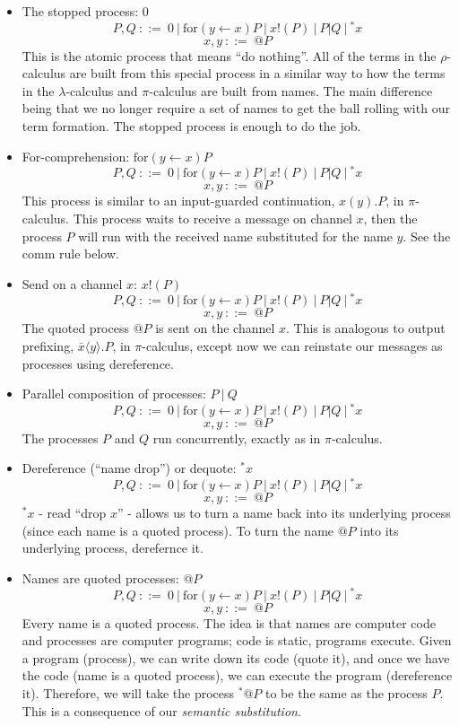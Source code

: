\documentclass[12pt]{article}
\numberwithin{equation}{section}
\begin{document}
\begin{itemize}
\item The stopped process: 0
\[ P, Q \ ::= \ 0 \ | \ \text{for}( y \leftarrow x)P \ | \ x!(P) \ | \ P | Q \ | \ {}^* x \]
\[ x, y \ ::= \ @P \]
This is the atomic process that means ``do nothing''. All of the terms in the $\rho$-calculus are built from this special process in a similar way to how the terms in the $\lambda$-calculus and $\pi$-calculus are built from names. The main difference being that we no longer require a set of names to get the ball rolling with our term formation. The stopped process is enough to do the job.

\item For-comprehension: $\text{for}( y \leftarrow x)P$
\[ P, Q \ ::= \ 0 \ | \ \text{for}( y \leftarrow x)P \ | \ x!(P) \ | \ P | Q \ | \ {}^* x \]
\[ x, y \ ::= \ @P \]
This process is similar to an input-guarded continuation, $x(y).P$, in $\pi$-calculus. This process waits to receive a message on channel $x$, then the process $P$ will run with the received name substituted for the name $y$. See the comm rule below. \\

\item Send on a channel $x$: $x!(P)$
\[ P, Q \ ::= \ 0 \ | \ \text{for}( y \leftarrow x)P \ | \ x!(P) \ | \ P | Q \ | \ {}^* x \]
\[ x, y \ ::= \ @P \]
The quoted process $@P$ is sent on the channel $x$. This is analogous to output prefixing, $\bar{x} \langle y \rangle.P$, in $\pi$-calculus, except now we can reinstate our messages as processes using dereference. \\

\item Parallel composition of processes: $P \ | \ Q$
\[ P, Q \ ::= \ 0 \ | \ \text{for}( y \leftarrow x)P \ | \ x!(P) \ | \ P | Q \ | \ {}^* x \]
\[ x, y \ ::= \ @P \]
The processes $P$ and $Q$ run concurrently, exactly as in $\pi$-calculus. \\

\item Dereference (``name drop'') or dequote: ${}^*x$
\[ P, Q \ ::= \ 0 \ | \ \text{for}( y \leftarrow x)P \ | \ x!(P) \ | \ P | Q \ | \ {}^* x \]
\[ x, y \ ::= \ @P \]
${}^*x$ - read ``drop $x$'' - allows us to turn a name back into its underlying process (since each name is a quoted process). To turn the name $@P$ into its underlying process, derefernce it. \\

\item Names are quoted processes: $@P$
\[ P, Q \ ::= \ 0 \ | \ \text{for}( y \leftarrow x)P \ | \ x!(P) \ | \ P | Q \ | \ {}^* x \]
\[ x, y \ ::= \ @P \]
Every name is a quoted process. The idea is that names are computer code and processes are computer programs; code is static, programs execute. Given a program (process), we can write down its code (quote it), and once we have the code (name is a quoted process), we can execute the program (dereference it). Therefore, we will take the process ${}^*@P$ to be the same as the process $P$. This is a consequence of our \emph{semantic substitution}.
\end{itemize}
\end{document}
